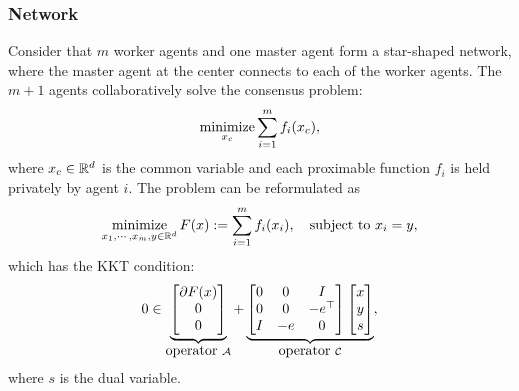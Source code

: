 \subsubsection{Network}\label{sec:network}
Consider that $m$ worker agents and one master agent form a star-shaped network, where the master agent at the center connects to each of the worker agents. The $m+1$ agents collaboratively solve the consensus problem:  $$\operatorname*{minimize}_{x_c} \sum_{i=1}^m f_i(x_c),$$ where $x_c\in \mathbb{R}^d$ is the common variable and each proximable function $f_i$ is held privately by agent $i$. The problem can be reformulated as
\begin{align}
\Min_{x_1,\cdots,x_m,y\in \RR^d} F(x) := \sum_{i=1}^mf_i(x_i),\quad \St~ x_i=y,
\end{align}
{which has the  KKT condition}:
\begin{equation}\label{pro:decentral}
0\in\underbrace{
\begin{bmatrix}
\partial F(x)\\
0 \\
0
\end{bmatrix}}_{\mbox{operator}~\cA}+\underbrace{\begin{bmatrix}
0 & 0&I\\
0 & 0 & -e^\top \\
I & -e & 0
\end{bmatrix}\begin{bmatrix}
x\\
y\\
s
\end{bmatrix}}_{\mbox{operator}~\cC},
\end{equation}
where $s$ is the dual variable.

